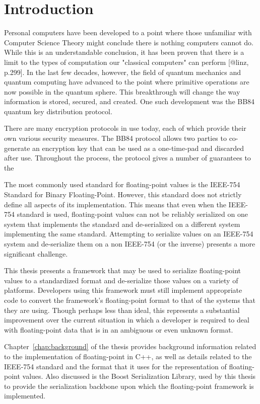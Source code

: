 \chapter{Introduction}
\label{chap:introduction}

Personal computers have been developed to a point where those unfamiliar with Computer Science Theory might conclude there is nothing computers cannot do.
While this is an understandable conclusion, it has been proven that there is a limit to the types of computation our "classical computers" can perform [@linz, p.299].
In the last few decades, however, the field of quantum mechanics and quantum computing have advanced to the point where primitive operations are now possible in the quantum sphere.
This breakthrough will change the way information is stored, secured, and created.
One such development was the BB84 quantum key distribution protocol.

There are many encryption protocols in use today, each of which provide their own various security measures.
The BB84 protocol allows two parties to co-generate an encryption key that can be used as a one-time-pad and discarded after use.
Throughout the process, the protocol gives a number of guarantees to the 

The most commonly used standard for floating-point values is the IEEE-754 Standard for Binary Floating-Point. However, this standard does not strictly define all aspects of its implementation. This means that even when the IEEE-754 standard is used, floating-point values can not be reliably serialized on one system that implements the standard and de-serialized on a different system implementing the same standard. Attempting to serialize values on an IEEE-754 system and de-serialize them on a non IEEE-754 (or the inverse) presents a more significant challenge.

This thesis presents a framework that may be used to serialize floating-point values to a standardized format and de-serialize those values on a variety of platforms. Developers using this framework must still implement appropriate code to convert the framework's floating-point format to that of the systems that they are using. Though perhaps less than ideal, this represents a substantial improvement over the current situation in which a developer is required to deal with floating-point data that is in an ambiguous or even unknown format.

Chapter~\ref{chap:background} of the thesis provides background information related to the implementation of floating-point in C++, as well as details related to the IEEE-754 standard and the format that it uses for the representation of floating-point values. Also discussed is the Boost Serialization Library, used by this thesis to provide the serialization backbone upon which the floating-point framework is implemented.

